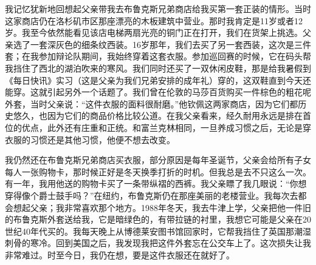 我记忆犹新地回想起父亲带我去布鲁克斯兄弟商店给我买第一套正装的情形。当时这家商店仍在洛杉矶市区那座漂亮的木板建筑中营业。那时我肯定是11岁或者12岁。我至今依然能看见该店电梯两扇光亮的铜门正在打开，我们在货架上挑选。父亲选了一套深灰色的细条纹西装。16岁那年，我们去买了另一套西装，这次是三件套；在我参加辩论队期间，我始终穿着这套衣服。参加巡回赛的时候，它在码头帮我挡住了西北的湖泊吹来的寒风。我们同时还买了一双休闲皮鞋，那是给我暑假到《每日快讯》实习（这是父亲为我们兄弟安排的成年礼）穿的，这双鞋直到今天还能穿。这就引起另外一个话题了。我们曾在伦敦的马莎百货购买一件棕色的粗花呢外套，当时父亲说：“这件衣服的面料很耐磨。”他钦佩这两家商店，因为它们都历史悠久，也因为它们的商品价格比较公道。在我父亲看来，经久耐用永远是排在首位的优点，此外还有庄重和正统。和富兰克林相同，一旦养成习惯之后，无论是穿衣服的习惯还是其他习惯，他便不想去改变。
\par

我仍然还在布鲁克斯兄弟商店买衣服，部分原因是每年圣诞节，父亲会给所有子女每人一张购物卡，那时候正好是冬天换季打折的时机。但我总是去不只这么一次。有一年，我用他送的购物卡买了一条带纵褶的西裤。我父亲瞟了我几眼说：“你想穿得像个爵士鼓手吗？”在纽约，布鲁克斯仍在那座美丽的老楼营业。我每次去都会想起父亲；我非常喜欢那个地方。1988年冬天，我去牛津上学，父亲把他一件旧的布鲁克斯外套送给我，它是暗绿色的，有带拉链的衬里，我想它可能是父亲在20世纪40年代买的。我每天晚上从博德莱安图书馆回家时，它帮我挡住了英国那潮湿刺骨的寒冷。回到美国之后，我发现我把这件外套忘在公交车上了。这次损失让我非常难过。时至今日，我仍在想，要是这件衣服还在就好了。
\par
